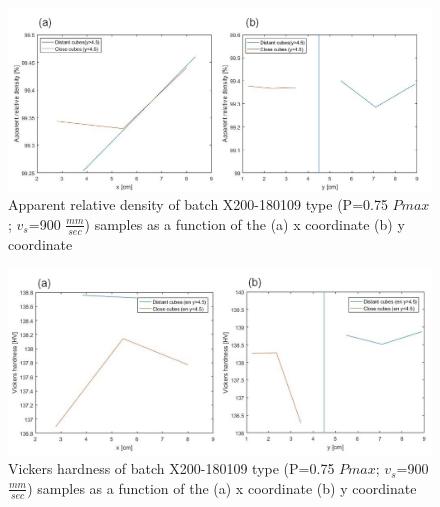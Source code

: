 \begin{figure}[ht]
\centering
\centerline{\includegraphics[scale=0.55]{Images/180109-8Dxy}}
\decoRule
\caption[Average apparent relative density of batch X200-180109 type (P=0.75 $Pmax$; $v_s$=900 $\frac{mm}{sec}$) samples as a function of the (a) x coordinate (b) y coordinate]{Apparent relative density of batch X200-180109 type (P=0.75 $Pmax$; $v_s$=900 $\frac{mm}{sec}$) samples as a function of the (a) x coordinate (b) y coordinate}
\label{180109-8Dxy}
\end{figure} 

\begin{figure}[ht]
\centering
\centerline{\includegraphics[scale=0.55]{Images/180109-8Hxy}}
\decoRule
\caption[Average Vickers hardness of batch X200-180109 type (P=0.75 $Pmax$; $v_s$=900 $\frac{mm}{sec}$) samples as a function of the (a) x coordinate (b) y coordinate]{Vickers hardness of batch X200-180109 type (P=0.75 $Pmax$; $v_s$=900 $\frac{mm}{sec}$) samples as a function of the (a) x coordinate (b) y coordinate}
\label{180109-8Hxy}
\end{figure} 